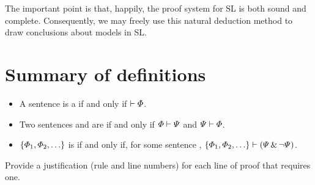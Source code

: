 The important point is that, happily, the proof system for SL is both sound and complete. Consequently, we may freely use this natural deduction method to draw conclusions about models in SL.


\section*{Summary of definitions}
\begin{itemize}
\item A sentence \metaA{} is a  if and only if $\vdash\varPhi{}$.

\item Two sentences \metaA{} and \metaB{} are  if and only if $\varPhi{}\vdash\varPsi{}$ and $\varPsi{}\vdash\varPhi{}$.

\item $\{\varPhi{}_1,\varPhi{}_2,\ldots\}$ is  if and only if, for some sentence \metaB{}, $\{\varPhi{}_1,\varPhi{}_2,\ldots\}\vdash(\varPsi{} \,\&\, \neg \varPsi{})$.
\end{itemize}



\practiceproblems

\solutions
\problempart
\label{pr.justifySLproof}
Provide a justification (rule and line numbers) for each line of proof that requires one.
\begin{multicols}{2}
\begin{ndproof}
 {}
 {}
\end{ndproof}

\begin{ndproof}
\open
\close
{}
\end{ndproof}

\begin{ndproof}
\open
	 {}
	\open
	\close
\close
{}
\end{ndproof}
\end{multicols}

